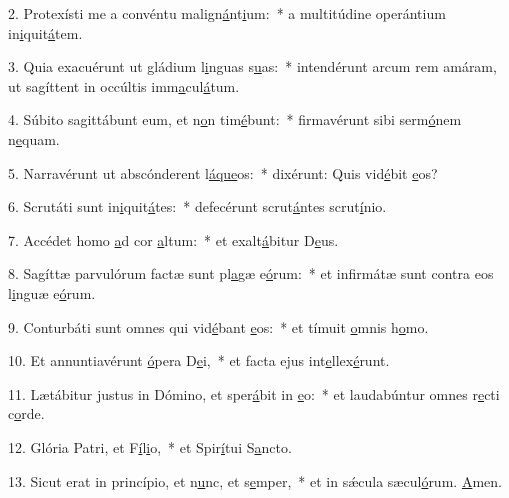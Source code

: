 2. Protexísti me a convéntu malign\uline{á}nt\uline{i}um:~* a multitúdine operántium in\uline{i}quit\uline{á}tem.\par 
3. Quia exacuérunt ut gládium l\uline{i}nguas s\uline{u}as:~* intendérunt arcum rem amáram, ut sagíttent in occúltis imm\uline{a}cul\uline{á}tum.\par 
4. Súbito sagittábunt eum, et n\uline{o}n tim\uline{é}bunt:~* firmavérunt sibi serm\uline{ó}nem n\uline{e}quam.\par 
5. Narravérunt ut abscónderent l\uline{á}\uline{que}os:~* dixérunt: Quis vid\uline{é}bit \uline{e}os?\par 
6. Scrutáti sunt in\uline{i}quit\uline{á}tes:~* defecérunt scrut\uline{á}ntes scrut\uline{í}nio.\par 
7. Accédet homo \uline{a}d cor \uline{a}ltum:~* et exalt\uline{á}bitur D\uline{e}us.\par 
8. Sagíttæ parvulórum factæ sunt pl\uline{a}gæ e\uline{ó}rum:~* et infirmátæ sunt contra eos l\uline{i}nguæ e\uline{ó}rum.\par 
9. Conturbáti sunt omnes qui vid\uline{é}bant \uline{e}os:~* et tímuit \uline{o}mnis h\uline{o}mo.\par 
10. Et annuntiavérunt \uline{ó}pera D\uline{e}i,~* et facta ejus int\uline{e}llex\uline{é}runt.\par 
11. Lætábitur justus in Dómino, et sper\uline{á}bit in \uline{e}o:~* et laudabúntur omnes r\uline{e}cti c\uline{o}rde.\par 
12. Glória Patri, et F\uline{í}l\uline{i}o,~* et Spir\uline{í}tui S\uline{a}ncto.\par 
13. Sicut erat in princípio, et n\uline{u}nc, et s\uline{e}mper,~* et in sǽcula sæcul\uline{ó}rum. \uline{A}men.\par 
